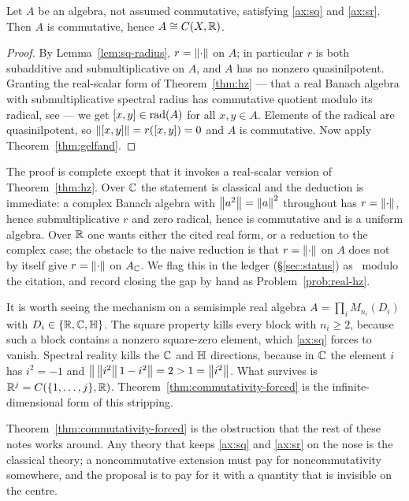 \begin{theorem}
\label{thm:commutativity-forced}
Let $A$ be an algebra, not assumed commutative, satisfying \eqref{ax:sq} and
\eqref{ax:sr}.  Then $A$ is commutative, hence $A\cong C(X,\mathbb{R})$.
\end{theorem}

\begin{proof}
By Lemma~\ref{lem:sq-radius}, $r=\left\lVert\cdot\right\rVert$ on $A$; in particular $r$ is
both subadditive and submultiplicative on $A$, and $A$ has no nonzero
quasinilpotent.  Granting the real-scalar form of Theorem~\ref{thm:hz} --- that
a real Banach algebra with submultiplicative spectral radius has commutative
quotient modulo its radical, see \cite[Ch.~3]{KulkarniLimaye} --- we get
$[x,y]\in\operatorname{rad}(A)$ for all $x,y\in A$.  Elements of the radical are
quasinilpotent, so $\left\lVert[x,y]\right\rVert=r([x,y])=0$ and $A$ is commutative.  Now apply
Theorem~\ref{thm:gelfand}.
\end{proof}

\begin{remark}
\label{rem:hz-status}
The proof is complete except that it invokes a real-scalar version of
Theorem~\ref{thm:hz}.  Over $\mathbb{C}$ the statement is classical and the deduction
is immediate: a complex Banach algebra with $\left\lVert a^2\right\rVert=\left\lVert a\right\rVert^2$ throughout
has $r=\left\lVert\cdot\right\rVert$, hence submultiplicative $r$ and zero radical, hence is
commutative and is a uniform algebra.  Over $\mathbb{R}$ one wants either the cited
real form, or a reduction to the complex case; the obstacle to the naive
reduction is that $r=\left\lVert\cdot\right\rVert$ on $A$ does not by itself give
$r=\left\lVert\cdot\right\rVert$ on $A_{\mathbb{C}}$.  We flag this in the ledger
(\S\ref{sec:status}) as \statusproved\ modulo the citation, and record closing
the gap by hand as Problem~\ref{prob:real-hz}.
\end{remark}

\begin{remark}\label{rem:fd-shadow}
It is worth seeing the mechanism on a semisimple real algebra
$A=\prod_i M_{n_i}(D_i)$ with $D_i\in\{\mathbb{R},\mathbb{C},\mathbb{H}\}$.  The square property
kills every block with $n_i\ge2$, because such a block contains a nonzero
square-zero element, which \eqref{ax:sq} forces to vanish.  Spectral reality
kills the $\mathbb{C}$ and $\mathbb{H}$ directions, because in $\mathbb{C}$ the element $i$ has
$i^2=-1$ and $\left\lVert\,\left\lVert i^2\right\rVert1-i^2\right\rVert=2>1=\left\lVert i^2\right\rVert$.  What survives is
$\mathbb{R}^j=C(\{1,\dots,j\},\mathbb{R})$.  Theorem~\ref{thm:commutativity-forced} is the
infinite-dimensional form of this stripping.
\end{remark}

\begin{remark}
Theorem~\ref{thm:commutativity-forced} is the obstruction that the rest of these
notes works around.  Any theory that keeps \eqref{ax:sq} and \eqref{ax:sr} on
the nose is the classical theory; a noncommutative extension must pay for
noncommutativity somewhere, and the proposal is to pay for it with a quantity
that is invisible on the centre.
\end{remark}
